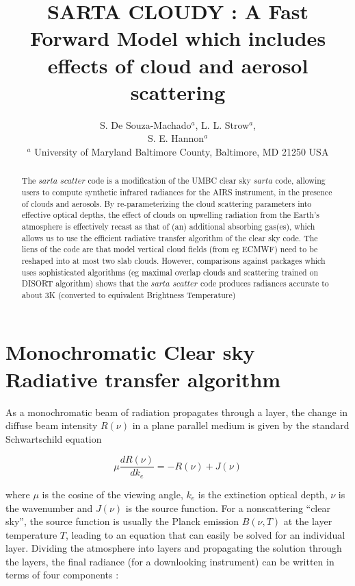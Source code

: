 \documentclass[11pt]{article}
\title{SARTA CLOUDY : A Fast Forward Model which includes effects of cloud and aerosol scattering}
\author{S. De Souza-Machado$^{a}$, L. L. Strow$^{a}$,\\
                S. E. Hannon$^{a}$ \\
     $^{a}$ University of Maryland Baltimore County, Baltimore, MD 21250 USA}
\begin{document}
\maketitle

\begin{abstract}

The $sarta$ $scatter$ code is a modification of the UMBC clear sky $sarta$ code, allowing users to compute 
synthetic infrared radiances for the AIRS instrument, in the presence of clouds and aerosols. By re-parameterizing the
cloud scattering parameters into effective optical depths, the effect of clouds on upwelling radiation from
the Earth's atmosphere is effectively recast as that of (an) additional absorbing gas(es), which allows us to use 
the efficient radiative transfer algorithm of the clear sky code. The liens of the code are that model vertical cloud
fields (from eg ECMWF) need to be reshaped into at most two slab clouds. However, comparisons against packages 
which uses sophisticated algorithms (eg maximal overlap clouds and scattering trained on DISORT algorithm) shows that
the $sarta$ $scatter$ code produces radiances accurate to about 3K (converted to equivalent Brightness Temperature)

\end{abstract}

\section{Monochromatic Clear sky Radiative transfer algorithm}

As a monochromatic beam of radiation propagates through a layer, the change in diffuse beam
intensity $R(\nu)$ in a plane parallel medium is given by the standard
Schwartschild equation \cite{lio:80,goo:89,edw:92}

\begin{equation}
\mu \frac{dR(\nu)}{dk_{e}} = -R(\nu) + J(\nu)
\label{eqn:sch}
\end{equation}

where $\mu$ is the cosine of the viewing angle, $k_{e}$ is the extinction
optical depth, $\nu$ is the wavenumber and $J(\nu)$ is the source function. For
a nonscattering ``clear sky'', the source function is usually the Planck
emission $B(\nu,T)$ at the layer temperature $T$, leading to an equation that
can easily be solved for an individual layer. Dividing the atmosphere into
layers and propagating the solution through the layers, the final radiance
(for a downlooking instrument) can be written in terms of four components :
\end{document}

